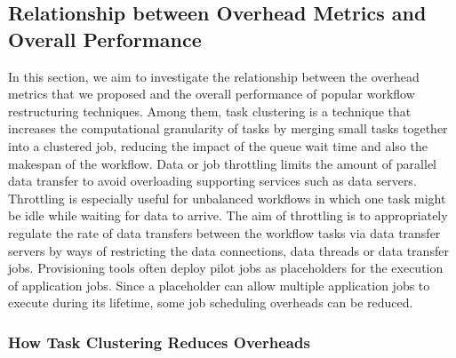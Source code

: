 \subsection{Relationship between Overhead Metrics and Overall Performance}

In this section, we aim to investigate the relationship between the overhead metrics that we proposed and the overall performance of popular workflow restructuring techniques. Among them, task clustering \cite{Singh2008} is a technique that increases the computational granularity of tasks by merging small tasks together into a clustered job, reducing the impact of the queue wait time and also the makespan of the workflow. Data or job throttling \cite{Humphrey2008} limits the amount of parallel data transfer to avoid overloading supporting services such as data servers. Throttling is especially useful for unbalanced workflows in which one task might be idle while waiting for data to arrive. The aim of throttling is to appropriately regulate the rate of data transfers between the workflow tasks via data transfer servers by ways of restricting the data connections, data threads or data transfer jobs. Provisioning tools often deploy pilot jobs as placeholders for the execution of application jobs. Since a placeholder can allow multiple application jobs to execute during its lifetime, some job scheduling overheads can be reduced. 

\subsubsection{How Task Clustering Reduces Overheads}

